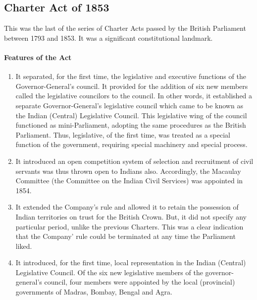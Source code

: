 \subsection{Charter Act of 1853}

This was the last of the series of Charter Acts passed by the British Parliament between 1793 and 1853. It was a significant constitutional landmark.
\paragraph{Features of the Act}

\begin{enumerate}
  \item It separated, for the first time, the legislative and executive functions of the Governor-General's council. It provided for the addition of six new members called the legislative councilors to the council. In other words, it established a separate Governor-General's legislative council which came to be known as the Indian (Central) Legislative Council. This legislative wing of the council functioned as mini-Parliament, adopting the same procedures as the British Parliament. Thus, legislative, of the first time, was treated as a special function of the government, requiring special machinery and special process.
  \item It introduced an open competition system of selection and recruitment of civil servants was thus thrown open to Indians also. Accordingly, the Macaulay Committee (the Committee on the Indian Civil Services) was appointed in 1854.
  \item It extended the Company's rule and allowed it to retain the possession of Indian territories on trust for the British Crown. But, it did not specify any particular period, unlike the previous Charters. This was a clear indication that the Company' rule could be terminated at any time the Parliament liked.
  \item It introduced, for the first time, local representation in the Indian (Central) Legislative Council. Of the six new legislative members of the governor-general's council, four members were appointed by the local (provincial) governments of Madras, Bombay, Bengal and Agra.
\end{enumerate}

